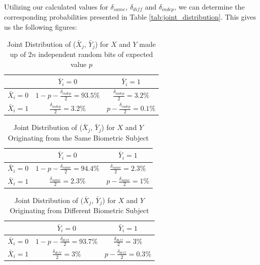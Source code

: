 Utilizing our calculated values for \(\delta_{same}\), \(\delta_{diff}\) and \(\delta_{indep}\), we can determine the corresponding probabilities presented in Table \ref{tab:joint_distribution}. This gives us the following figures:

\begin{table}[H]
    \centering
    \renewcommand{\arraystretch}{1.5}
    \begin{tabular}{|c|c|c|}
        \hline
        & $\bar{Y}_i = 0$ & $\bar{Y}_i = 1$\\
        \hline
        $\bar{X}_i = 0$ & $1 - p - \frac{\delta_{indep}}{2} = 93.5\% $ & $\frac{\delta_{indep}}{2} = 3.2\%$\\
        \hline
        $\bar{X}_i = 1$ & $\frac{\delta_{indep}}{2} = 3.2\% $ & $p - \frac{\delta_{indep}}{2} = 0.1\%$\\
        \hline
    \end{tabular}
    \caption{Joint Distribution of ($\bar{X}_j$, $\bar{Y}_j$) for \(X\) and \(Y\) made up of \(2n\) independent random bits of expected value \(p\)}
    \label{tab:joint_distribution_deltaindep}
\end{table}


\begin{table}[H]
    \centering
    \renewcommand{\arraystretch}{1.5}
    \begin{tabular}{|c|c|c|}
        \hline
        & $\bar{Y}_i = 0$ & $\bar{Y}_i = 1$\\
        \hline
        $\bar{X}_i = 0$ & $1 - p - \frac{\delta_{same}}{2} = 94.4\% $ & $\frac{\delta_{same}}{2} = 2.3\%$\\
        \hline
        $\bar{X}_i = 1$ & $\frac{\delta_{same}}{2} = 2.3\%$ & $p - \frac{\delta_{same}}{2} = 1\%$\\
        \hline
    \end{tabular}
    \caption{Joint Distribution of ($\bar{X}_j$, $\bar{Y}_j$) for \(X\) and \(Y\)  Originating from the Same Biometric Subject}
    \label{tab:joint_distribution_deltasame}
\end{table}

\begin{table}[H]
    \centering
    \renewcommand{\arraystretch}{1.5}
    \begin{tabular}{|c|c|c|}
        \hline
        & $\bar{Y}_i = 0$ & $\bar{Y}_i = 1$\\
        \hline
        $\bar{X}_i = 0$ & $1 - p - \frac{\delta_{diff}}{2} = 93.7\% $ & $\frac{\delta_{diff}}{2} = 3\%$\\
        \hline
        $\bar{X}_i = 1$ & $\frac{\delta_{diff}}{2} = 3\%$ & $p - \frac{\delta_{diff}}{2} = 0.3\%$\\
        \hline
    \end{tabular}
    \caption{Joint Distribution of ($\bar{X}_j$, $\bar{Y}_j$) for \(X\) and \(Y\) Originating from Different Biometric Subject}
    \label{tab:joint_distribution_deltadiff}
\end{table}








